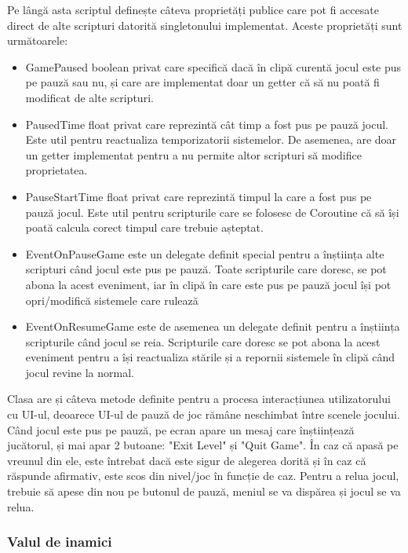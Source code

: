 \documentclass[12pt, a4paper]{article}
\begin{document}
	Pe lângă asta scriptul definește câteva proprietăți publice care pot fi accesate direct de alte scripturi datorită singletonului implementat. Aceste proprietăți sunt următoarele:
	
	\begin{itemize}
		\item GamePaused boolean privat care specifică dacă în clipă curentă jocul este pus pe pauză sau nu, și care are implementat doar un getter că să nu poată fi modificat de alte scripturi.
		\item PausedTime float privat care reprezintă cât timp a fost pus pe pauză jocul. Este util pentru reactualiza temporizatorii sistemelor. De asemenea, are doar un getter implementat pentru a nu permite altor scripturi să modifice proprietatea.
		\item PauseStartTime float privat care reprezintă timpul la care a fost pus pe pauză jocul. Este util pentru scripturile care se folosesc de Coroutine că să își poată calcula corect timpul care trebuie așteptat.
		\item EventOnPauseGame este un delegate definit special pentru a înștiința alte scripturi când jocul este pus pe pauză. Toate scripturile care doresc, se pot abona la acest eveniment, iar în clipă în care este pus pe pauză jocul își pot opri/modifică sistemele care rulează
		\item EventOnResumeGame este de asemenea un delegate definit pentru a înștiința scripturile când jocul se reia. Scripturile care doresc se pot abona la acest eveniment pentru a își reactualiza stările și a repornii sistemele în clipă când jocul revine la normal.
	\end{itemize}
	
	Clasa are și câteva metode definite pentru a procesa interacțiunea utilizatorului cu UI-ul, deoarece UI-ul de pauză de joc rămâne neschimbat între scenele jocului. Când jocul este pus pe pauză, pe ecran apare un mesaj care înștiințează jucătorul, și mai apar 2 butoane: "Exit Level" și "Quit Game". În caz că apasă pe vreunul din ele, este întrebat dacă este sigur de alegerea dorită și în caz că răspunde afirmativ, este scos din nivel/joc în funcție de caz. Pentru a relua jocul, trebuie să apese din nou pe butonul de pauză, meniul se va dispărea și jocul se va relua.
	
	
	
	
	
	\subsubsection{Valul de inamici}
	\label{section: enemyWave}
	
\end{document}
